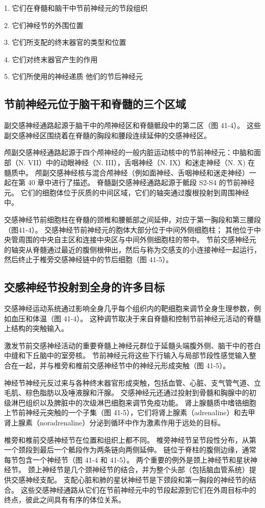 1. 它们在脊髓和脑干中节前神经元的节段组织 

2. 它们神经节的外围位置 

3. 它们所支配的终末器官的类型和位置 

4. 它们对终末器官产生的作用 

5. 它们所使用的神经递质 他们的节后神经元

\subsection{节前神经元位于脑干和脊髓的三个区域}
副交感神经通路起源于脑干中的颅神经区和脊髓骶段中的第二区（图 41-4）。 这些副交感神经区围绕着在脊髓的胸段和腰段连续延伸的交感神经区。

颅副交感神经通路起源于四个颅神经的一般内脏运动核中的节前神经元：中脑和面部（N. VII）中的动眼神经（N. III），舌咽神经（N. IX）和迷走神经（N. X) 在髓质中。 颅副交感神经核与混合颅神经（例如面神经、舌咽神经和迷走神经）一起在第 40 章中进行了描述。 脊髓副交感神经通路起源于骶段 S2-S4 的节前神经元。 它们的细胞体位于灰质的中间区域，它们的轴突通过腹根投射到周围神经中。

交感神经节前细胞柱在脊髓的颈椎和腰骶部之间延伸，对应于第一胸段和第三腰段（图41-4）。 交感神经节前神经元的胞体大部分位于中间外侧细胞柱； 其他位于中央管周围的中央自主区和连接中央区与中间外侧细胞柱的带中。 节前交感神经元的轴突从脊髓通过最近的腹侧根伸出，然后与称为交感支的小连接神经一起运行，然后终止于椎旁交感神经链中的节后细胞（图 41-5）。

\subsection{交感神经节投射到全身的许多目标}
交感神经运动系统通过影响全身几乎每个组织内的靶细胞来调节全身生理参数，例如血压和体温（图 41-4）。 这种调节取决于来自脊髓和控制节前神经元活动的脊髓上结构的突触输入。

激发节前交感神经活动的重要脊髓上神经元群位于延髓头端腹外侧、脑干中的苍白中缝和下丘脑中的室旁核。 节前神经元将这些下行输入与局部节段性感觉输入整合在一起，并与椎旁和椎前交感神经节中的神经元形成突触（图 41-5）。

神经节神经元反过来与各种终末器官形成突触，包括血管、心脏、支气管气道、立毛肌、棕色脂肪以及唾液腺和汗腺。 交感神经元还通过投射到骨髓和胸腺中的初级淋巴组织以及脾脏中的次级淋巴细胞来调节免疫功能。 肾上腺髓质中嗜铬细胞上节前神经元突触的一个子集（图 41-5），它们将肾上腺素（adrenaline）和去甲肾上腺素（noradrenaline）分泌到循环中作为激素作用于远处的目标。

椎旁和椎前交感神经节在位置和组织上都不同。 椎旁神经节呈节段性分布，从第一个颈段到最后一个骶段作为两条链向两侧延伸。 链位于脊柱的腹侧边缘，通常每节包含一个神经节（图 41-4 和 41-5）。 两个重要的例外是颈上神经节和星状神经节。 颈上神经节是几个颈神经节的结合，并为整个头部（包括脑血管系统）提供交感神经支配。 支配心脏和肺的星状神经节是下颈段和第一胸段的神经节的结合。 这些交感神经通路从它们在节前神经元中的节段起源到它们在外周目标中的终点，彼此之间具有有序的体位关系。

